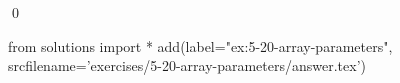 
\begin{ex}
  \label{ex:5-20-array-parameters}
  
  \qed
\end{ex}
\begin{python0}
from solutions import *
add(label="ex:5-20-array-parameters",
    srcfilename='exercises/5-20-array-parameters/answer.tex')
\end{python0}
